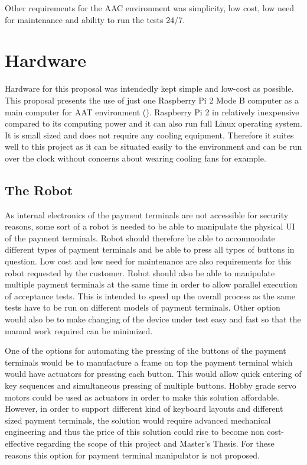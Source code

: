 Other requirements for the AAC environment was simplicity, low cost, low need for maintenance and ability to run the tests 24/7.

\section{Hardware}
\label{section:Proposed hardware}

Hardware for this proposal was intendedly kept simple and low-cost as possible. This proposal presents the use of just one Raspberry Pi 2 Mode B computer as a main computer for AAT environment (\emph{\cite{raspberry}}). Raspberry Pi 2 in relatively inexpensive compared to its computing power and it can also run full Linux operating system. It is small sized and does not require any cooling equipment. Therefore it suites well to this project as it can be situated easily to the environment and can be run over the clock without concerns about wearing cooling fans for example.

\FloatBarrier
\subsection{The Robot}
\label{subsection:The Robot proposal}

As internal electronics of the payment terminals are not accessible for security reasons, some sort of a robot is needed to be able to manipulate the physical UI of the payment terminals. Robot should therefore be able to accommodate different types of payment terminals and be able to press all types of buttons in question. Low cost and low need for maintenance are also requirements for this robot requested by the customer. Robot should also be able to manipulate multiple payment terminals at the same time in order to allow parallel execution of acceptance tests. This is intended to speed up the overall process as the same tests have to be run on different models of payment terminals. Other option would also be to make changing of the device under test easy and fast so that the manual work required can be minimized.

One of the options for automating the pressing of the buttons of the payment terminals would be to manufacture a frame on top the payment terminal which would have actuators for pressing each button. This would allow quick entering of key sequences and simultaneous pressing of multiple buttons. Hobby grade servo motors could be used as actuators in order to make this solution affordable. However, in order to support different kind of keyboard layouts and different sized payment terminals, the solution would require advanced mechanical engineering and thus the price of this solution could rise to become non cost-effective regarding the scope of this project and Master's Thesis. For these reasons this option for payment terminal manipulator is not proposed.

